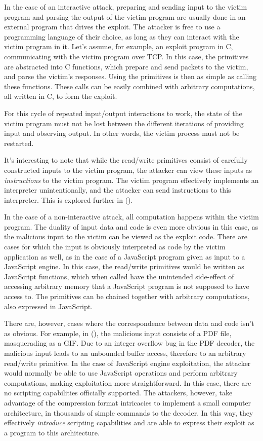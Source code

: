 \documentclass[
  a4paper,
]{report}
\begin{document}
In the case of an interactive attack, preparing and sending input to the
victim program and parsing the output of the victim program are usually
done in an external program that drives the exploit. The attacker is
free to use a programming language of their choice, as long as they can
interact with the victim program in it. Let's assume, for example, an
exploit program in C, communicating with the victim program over TCP. In
this case, the primitives are abstracted into C functions, which prepare
and send packets to the victim, and parse the victim's responses. Using
the primitives is then as simple as calling these functions. These calls
can be easily combined with arbitrary computations, all written in C, to
form the exploit.

For this cycle of repeated input/output interactions to work, the state
of the victim program must not be lost between the different iterations
of providing input and observing output. In other words, the victim
process must not be restarted.

It's interesting to note that while the read/write primitives consist of
carefully constructed inputs to the victim program, the attacker can
view these inputs as \emph{instructions} to the victim program. The
victim program effectively implements an interpreter unintentionally,
and the attacker can send instructions to this interpreter. This is
explored further in ().

In the case of a non-interactive attack, all computation happens within
the victim program. The duality of input data and code is even more
obvious in this case, as the malicious input to the victim can be viewed
as the exploit code. There are cases for which the input is obviously
interpreted as code by the victim application as well, as in the case of
a JavaScript program given as input to a JavaScript engine. In this
case, the read/write primitives would be written as JavaScript
functions, which when called have the unintended side-effect of
accessing arbitrary memory that a JavaScript program is not supposed to
have access to. The primitives can be chained together with arbitrary
computations, also expressed in JavaScript.

There are, however, cases where the correspondence between data and code
isn't as obvious. For example, in (), the malicious input consists of a PDF file, masquerading as a
GIF. Due to an integer overflow bug in the PDF decoder, the malicious
input leads to an unbounded buffer access, therefore to an arbitrary
read/write primitive. In the case of JavaScript engine exploitation, the
attacker would normally be able to use JavaScript operations and perform
arbitrary computations, making exploitation more straightforward. In
this case, there are no scripting capabilities officially supported. The
attackers, however, take advantage of the compression format intricacies
to implement a small computer architecture, in thousands of simple
commands to the decoder. In this way, they effectively \emph{introduce}
scripting capabilities and are able to express their exploit as a
program to this architecture.
\end{document}
